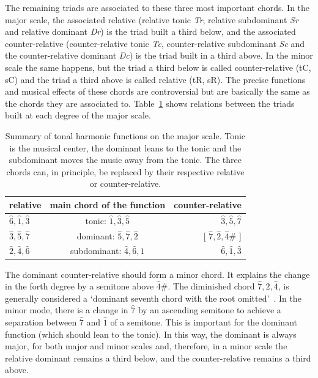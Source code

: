 The remaining triads are associated to these three most important chords. In the major scale, the associated relative (relative tonic \textit{Tr}, relative
subdominant \textit{Sr} and relative dominant \textit{Dr}) is the triad built a third below, and the associated counter-relative (counter-relative tonic \textit{Tc}, counter-relative subdominant \textit{Sc} and the counter-relative dominant \textit{Dc}) is the triad built in a third above. In the minor scale the same happens, but the triad a third below is called counter-relative (tC, sC) and the triad a third above is called relative (tR,
sR). The precise functions and musical effects of these chords are
controversial but are basically the same as the chords they are associated to.
Table~\ref{tab:harmonia} shows relations between the triads built at each degree of the major scale.

\begin{table}[htp!]
\centering
\caption{Summary of tonal harmonic functions on the major scale.
Tonic is the musical center, the dominant leans to the tonic and the subdominant moves the music away from
the tonic. The three chords can, in principle, be replaced by their
respective relative or counter-relative.}
\begin{tabular}{l | c | r}
relative & main chord of the function & counter-relative \\\hline\hline
$\hat{6},\hat{1},\hat{3}$ & tonic:       $\hat{1},\hat{3},\hat{5}$ & $\hat{3}, \hat{5},      \hat{7}$ \\
$\hat{3},\hat{5},\hat{7}$ & dominant:    $\hat{5},\hat{7},\hat{2}$ & [ $\hat{7},\hat{2},\hat{4}\#$ ] \\
$\hat{2},\hat{4},\hat{6}$ & subdominant: $\hat{4},\hat{6},\hat{1}$ & $\hat{6},\hat{1},       \hat{3}$
\end{tabular}
\label{tab:harmonia}
\end{table}

The dominant counter-relative should form a minor chord. It explains the change in the forth degree by a semitone above $\hat{4}\#$. The diminished chord
$\hat{7},\hat{2},\hat{4}$, is generally considered a `dominant seventh chord with the root omitted'~\cite{Koellheuteur}.
In the minor mode, there is a change in $\hat{7}$ by an ascending semitone to achieve a separation between $\hat{7}$ and $\hat{1}$ of a semitone. This is important for the dominant function (which should lean to the tonic). In this way, the dominant is always major, for both major and minor scales and, therefore, in a minor scale the relative dominant remains a third below, and the counter-relative remains a third above.

